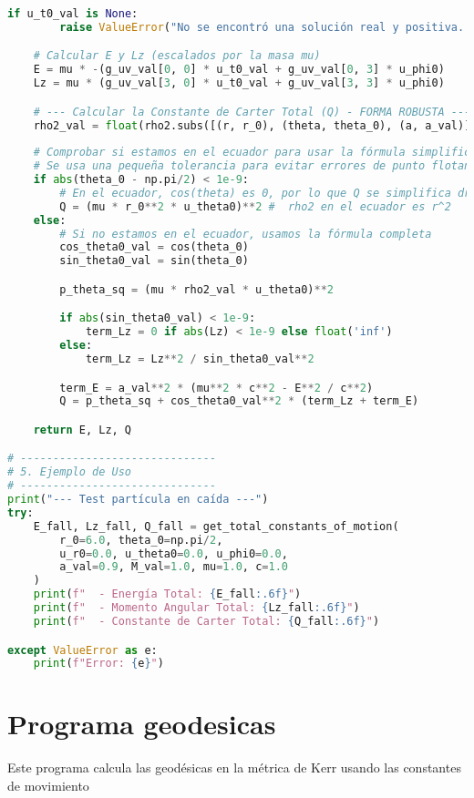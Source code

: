 \begin{lstlisting}[language=Python, caption={Programa para el calculo de las constantes de movimiento en Kerr}]
    if u_t0_val is None:
        raise ValueError("No se encontró una solución real y positiva. Revisa las condiciones iniciales.")

    # Calcular E y Lz (escalados por la masa mu)
    E = mu * -(g_uv_val[0, 0] * u_t0_val + g_uv_val[0, 3] * u_phi0)
    Lz = mu * (g_uv_val[3, 0] * u_t0_val + g_uv_val[3, 3] * u_phi0)

    # --- Calcular la Constante de Carter Total (Q) - FORMA ROBUSTA ---
    rho2_val = float(rho2.subs([(r, r_0), (theta, theta_0), (a, a_val)]))
    
    # Comprobar si estamos en el ecuador para usar la fórmula simplificada
    # Se usa una pequeña tolerancia para evitar errores de punto flotante
    if abs(theta_0 - np.pi/2) < 1e-9:
        # En el ecuador, cos(theta) es 0, por lo que Q se simplifica drásticamente
        Q = (mu * r_0**2 * u_theta0)**2 #  rho2 en el ecuador es r^2
    else:
        # Si no estamos en el ecuador, usamos la fórmula completa
        cos_theta0_val = cos(theta_0)
        sin_theta0_val = sin(theta_0)

        p_theta_sq = (mu * rho2_val * u_theta0)**2

        if abs(sin_theta0_val) < 1e-9:
            term_Lz = 0 if abs(Lz) < 1e-9 else float('inf')
        else:
            term_Lz = Lz**2 / sin_theta0_val**2

        term_E = a_val**2 * (mu**2 * c**2 - E**2 / c**2)
        Q = p_theta_sq + cos_theta0_val**2 * (term_Lz + term_E)

    return E, Lz, Q

# ------------------------------
# 5. Ejemplo de Uso 
# ------------------------------
print("--- Test partícula en caída ---")
try:
    E_fall, Lz_fall, Q_fall = get_total_constants_of_motion(
        r_0=6.0, theta_0=np.pi/2, 
        u_r0=0.0, u_theta0=0.0, u_phi0=0.0,
        a_val=0.9, M_val=1.0, mu=1.0, c=1.0
    )
    print(f"  - Energía Total: {E_fall:.6f}")
    print(f"  - Momento Angular Total: {Lz_fall:.6f}")
    print(f"  - Constante de Carter Total: {Q_fall:.6f}")

except ValueError as e:
    print(f"Error: {e}")

\end{lstlisting}

\section{Programa geodesicas}
\label{chap:programa_geodesicas}
Este programa calcula las geodésicas en la métrica de Kerr usando las constantes de movimiento

